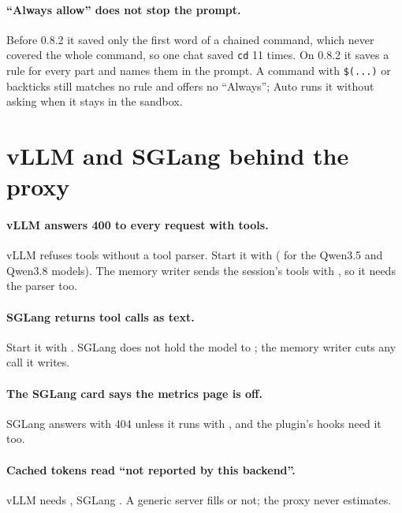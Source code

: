 \paragraph{\enquote{Always allow} does not stop the prompt.} Before 0.8.2 it saved only the first word of a chained command, which never covered the whole command, so one chat saved \texttt{cd} 11 times. On 0.8.2 it saves a rule for every part and names them in the prompt. A command with \texttt{\$(...)} or backticks still matches no rule and offers no \enquote{Always}; Auto runs it without asking when it stays in the sandbox.

\section{vLLM and SGLang behind the proxy}

\paragraph{vLLM answers 400 to every request with tools.} vLLM refuses tools without a tool parser. Start it with  ( for the Qwen3.5 and Qwen3.8 models). The memory writer sends the session's tools with , so it needs the parser too.

\paragraph{SGLang returns tool calls as text.} Start it with . SGLang does not hold the model to ; the memory writer cuts any call it writes.

\paragraph{The SGLang card says the metrics page is off.} SGLang answers  with 404 unless it runs with , and the plugin's hooks need it too.

\paragraph{Cached tokens read \enquote{not reported by this backend}.} vLLM needs , SGLang . A generic server fills  or not; the proxy never estimates.

